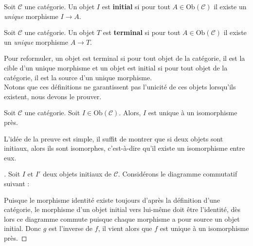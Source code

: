 \documentclass{article}
\begin{document}
\begin{definition}{}
    Soit $\mathcal C$ une catégorie. Un objet $I$ est \textbf{initial} si pour tout $A\in\text{Ob}(\mathcal C)$ il existe un \textit{unique} morphisme $I\to A$.
\end{definition}

\begin{definition}{}
    Soit $\mathcal C$ une catégorie. Un objet $T$ est \textbf{terminal} si pour tout $A\in\text{Ob}(\mathcal C)$ il existe un \textit{unique} morphisme $A\to T$.
\end{definition}

Pour reformuler, un objet est terminal si pour tout objet de la catégorie, il est la cible d'un unique morphisme et un objet est initial si pour tout objet de la catégorie, il est la source d'un unique morphisme.\\

Notons que ces définitions ne garantissent pas l'unicité de ces objets lorsqu'ils existent, nous devons le prouver.

\begin{lemma}{}
    Soit $\mathcal C$ une catégorie. Soit $I\in\text{Ob}(\mathcal C)$. Alors, $I$ est unique à un isomorphisme près.
\end{lemma}

\noindent
L'idée de la preuve est simple, il suffit de montrer que si deux objets sont initiaux, alors ils sont isomorphes, c'est-à-dire qu'il existe un isomorphisme entre eux.

\begin{proof}[]{}
    Soit $I$ et $I'$ deux objets initiaux de $\mathcal C$. Considérons le diagramme commutatif suivant :
    \begin{center}
    \end{center}
    Puisque le morphisme identité existe toujours d'après la définition d'une catégorie, le morphisme d'un objet initial vers lui-même doit être l'identité, dès lors ce diagramme commute puisque chaque morphisme a pour source un objet initial. Donc $g$ est l'inverse de $f$, il vient alors que $f$ est unique à un isomorphisme près.
\end{proof}
\end{document}
